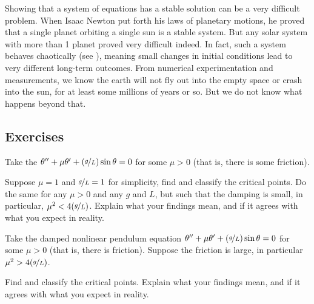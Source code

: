 Showing that a system of equations has a stable solution can be a very
difficult problem.  When Isaac Newton put forth his laws of
planetary motions, he proved that a single planet orbiting a single sun is a
stable system.  But any solar system with more than 1 planet proved very
difficult indeed.  In fact, such a system behaves chaotically (see 
), meaning small changes in initial conditions lead to very
different long-term outcomes.  From numerical experimentation and
measurements, we know the earth will not fly out into the empty space
or crash into the sun, for at least some millions of years or so.
But we do not know what happens beyond that.

\subsection{Exercises}

\begin{exercise}
Take the \emph{} $\theta '' + \mu \theta' +
(\nicefrac{g}{L})
\sin \theta = 0$ for some $\mu > 0$ (that is, there is some friction).
\begin{tasks}
\task
Suppose $\mu = 1$ and $\nicefrac{g}{L} = 1$ for simplicity, find and
classify the critical points.
\task
Do the same for any $\mu > 0$ and any $g$
and $L$, but such that the damping is small, in particular, $\mu^2 <
4(\nicefrac{g}{L})$.
\task
Explain what your findings mean, and if it agrees with what you
expect in reality.
\end{tasks}
\end{exercise}

\begin{exercise}\ansMark%
Take the damped nonlinear pendulum equation $\theta '' + \mu \theta' +
(\nicefrac{g}{L})
\sin \theta = 0$ for some $\mu > 0$ (that is, there is friction).
Suppose the friction is large, in particular $\mu^2 > 4 (\nicefrac{g}{L})$.
\begin{tasks}
\task
Find and classify the critical points.
\task
Explain what your findings mean, and if it agrees with what you
expect in reality.
\end{tasks}
\end{exercise}

